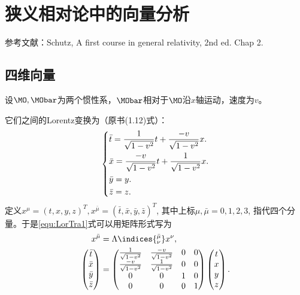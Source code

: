 \chapter{狭义相对论中的向量分析}
\label{chap:SR_vecAnaly}

参考文献：Schutz, A first course in general relativity, 2nd ed. Chap 2.

\section{四维向量}
\label{sec:fourVec}
设$\MO, \MObar$为两个惯性系，$\MObar$相对于$\MO$沿$x$轴运动，速度为$v$。

它们之间的Lorentz变换为（原书(1.12)式）：
\begin{equation}
\label{equ:LorTra1}
\begin{dcases}
    \bar{t} = \frac{1}{\sqrt{1 - v^2}} t + \frac{-v}{\sqrt{1 - v^2}} x. \\
    \bar{x} = \frac{-v}{\sqrt{1 - v^2}} t + \frac{1}{\sqrt{1 - v^2}} x. \\
    \bar{y} = y. \\
    \bar{z} = z. 
\end{dcases}
\end{equation}
定义$x^\mu = (t, x, y, z)^T, x^{\bar{\mu}} = (\bar{t}, \bar{x}, \bar{y}, \bar{z})^T$, 其中上标$\mu, \bar{\mu} = 0, 1, 2, 3$, 指代四个分量。于是\eqref{equ:LorTra1}式可以用矩阵形式写为
\begin{align}
\displaystyle
    x^{\bar{\mu}} &= \Lambda\indices{^{\bar{\mu}}_\nu} x^\nu, \\
    \begin{pmatrix}
        \bar{t} \\ \bar{x} \\ \bar{y} \\ \bar{z}
    \end{pmatrix} 
    &= 
    \begin{pmatrix}
        \frac{1}{\sqrt{1 - v^2}} & \frac{-v}{\sqrt{1 - v^2}} & 0 & 0 \\
        \frac{-v}{\sqrt{1 - v^2}} & \frac{1}{\sqrt{1 - v^2}} & 0 & 0 \\
        0 & 0 & 1 & 0 \\
        0 & 0 & 0 & 1
    \end{pmatrix}
    \begin{pmatrix}
        t \\ x \\ y \\ z
    \end{pmatrix}. \label{equ:LonTraMat1}
\end{align}

